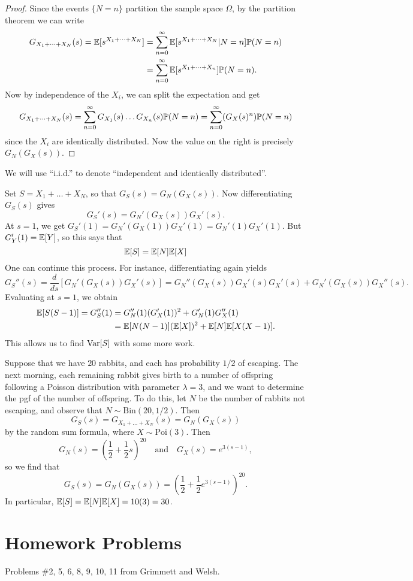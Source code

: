 \begin{proof}
  Since the events $\{N = n\}$ partition
  the sample space $\Omega$,
  by the partition theorem we can write
  \begin{align*}
    G_{X_1 + \dots + X_N}(s)
    = \mathbb{E}[s^{X_1 + \dots + X_N}]
    &= \sum_{n = 0}^\infty \mathbb{E}[s^{X_1 + \dots + X_N} | N = n] \mathbb{P}(N = n) \\
    &= \sum_{n = 0}^\infty \mathbb{E}[s^{X_1 + \dots + X_n}] \mathbb{P}(N = n).
  \end{align*}
  Now by independence of the $X_i$, we can
  split the expectation and get
  \[
    G_{X_1 + \dots + X_N}(s)
    = \sum_{n = 0}^\infty G_{X_1}(s) \dots G_{X_n}(s) \mathbb{P}(N = n)
    = \sum_{n = 0}^\infty (G_X(s)^n) \mathbb{P}(N = n)
  \]
  since the $X_i$ are identically distributed.
  Now the value on the right is precisely
  $G_N(G_X(s))$.
\end{proof}

\begin{remark}
  We will use ``i.i.d.'' to denote
  ``independent and identically distributed''.
\end{remark}

\begin{remark}
  Set $S = X_1 + \dots + X_N$, so that
  $G_S(s) = G_N(G_X(s))$. Now differentiating
  $G_S(s)$ gives
  \[
    G_S'(s) = G_N'(G_X(s)) G_X'(s).
  \]
  At $s = 1$, we get
  $G_S'(1) = G_N'(G_X(1)) G_X'(1) = G_N'(1) G_X'(1)$.
  But $G_Y'(1) = \mathbb{E}[Y]$, so this says that
  \[
    \mathbb{E}[S] = \mathbb{E}[N] \mathbb{E}[X]
  \]
  One can continue this process. For instance,
  differentiating again yields
  \[
    G_S''(s)
    = \frac{d}{ds} \left[G_N'(G_X(s)) G_X'(s)\right]
    = G_N''(G_X(s)) G_X'(s) G_X'(s) + G_N'(G_X(s)) G_X''(s).
  \]
  Evaluating at $s = 1$, we obtain
  \begin{align*}
    \mathbb{E}[S(S - 1)]
    = G_S''(1)
    &= G_N''(1) (G_X'(1))^2 + G_N'(1) G_X''(1) \\
    &= \mathbb{E}[N(N - 1)] (\mathbb{E}[X])^2 + \mathbb{E}[N] \mathbb{E}[X(X - 1)].
  \end{align*}
  This allows us to find $\operatorname{Var}[S]$ with some more
  work.
\end{remark}

\begin{example}
  Suppose that we have $20$ rabbits, and each
  has probability $1 / 2$ of escaping. The next
  morning, each remaining rabbit gives birth
  to a number of offspring following a Poisson
  distribution with parameter $\lambda = 3$,
  and we want to determine the pgf of the number
  of offspring. To do this, let $N$ be the number
  of rabbits not escaping, and observe that
  $N \sim \mathrm{Bin}(20, 1 / 2)$. Then
  \[
    G_S(s) = G_{X_1 + \dots + X_N}(s)
    = G_N(G_X(s))
  \]
  by the random sum formula, where
  $X \sim \mathrm{Poi}(3)$. Then
  \[
    G_N(s) = \left(\frac{1}{2} + \frac{1}{2}s\right)^{20} \quad \text{and} \quad
    G_X(s) = e^{3(s - 1)},
  \]
  so we find that
  \[
    G_S(s) = G_N(G_X(s))
    = \left(\frac{1}{2} + \frac{1}{2} e^{3(s - 1)}\right)^{20}.
  \]
  In particular, $\mathbb{E}[S] = \mathbb{E}[N] \mathbb{E}[X] = 10(3) = 30$.
\end{example}

\section{Homework Problems}
Problems \#2, 5, 6, 8, 9, 10, 11 from Grimmett and
Welsh.
